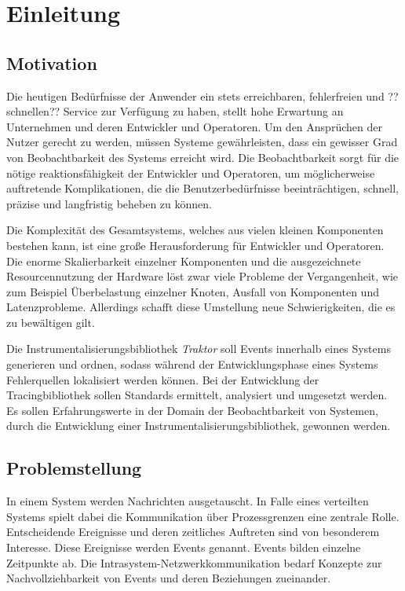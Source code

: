 %

\chapter{Einleitung}
\label{chapter:Einleitung}


\section{Motivation}
\label{section:Motivation}
	Die heutigen Bedürfnisse der Anwender ein stets erreichbaren, fehlerfreien und ??schnellen?? Service zur Verfügung zu haben, stellt hohe Erwartung an Unternehmen und deren Entwickler und Operatoren. Um den Ansprüchen der Nutzer gerecht zu werden, müssen Systeme gewährleisten, dass ein gewisser Grad von Beobachtbarkeit des Systems erreicht wird. Die Beobachtbarkeit sorgt für die nötige reaktionsfähigkeit der Entwickler und Operatoren, um möglicherweise auftretende Komplikationen, die die  Benutzerbedürfnisse beeinträchtigen, schnell, präzise und langfristig beheben zu können.
	
	Die Komplexität des Gesamtsystems, welches aus vielen kleinen Komponenten bestehen kann, ist eine große Herausforderung für Entwickler und Operatoren. Die enorme Skalierbarkeit einzelner Komponenten und die ausgezeichnete Resourcennutzung der Hardware löst zwar viele Probleme der Vergangenheit, wie zum Beispiel Überbelastung einzelner Knoten, Ausfall von Komponenten und Latenzprobleme. Allerdings schafft diese Umstellung neue Schwierigkeiten, die es zu bewältigen gilt. 
	
	Die Instrumentalisierungsbibliothek \emph{Traktor} soll Events innerhalb eines Systems generieren und ordnen, sodass während der Entwicklungsphase eines Systems Fehlerquellen lokalisiert werden können. Bei der Entwicklung der Tracingbibliothek sollen Standards ermittelt, analysiert und umgesetzt werden. Es sollen Erfahrungswerte in der Domain der Beobachtbarkeit von Systemen, durch die Entwicklung einer Instrumentalisierungsbibliothek, gewonnen werden.
	
\section{Problemstellung}
\label{section:Problemstellung}
	In einem System werden Nachrichten ausgetauscht. In Falle eines verteilten Systems spielt dabei die Kommunikation über Prozessgrenzen eine zentrale Rolle.
	Entscheidende Ereignisse und deren zeitliches Auftreten sind von besonderem Interesse. Diese Ereignisse werden Events genannt. Events bilden einzelne Zeitpunkte ab. Die Intrasystem-Netzwerkkommunikation bedarf Konzepte zur Nachvollziehbarkeit von Events und deren Beziehungen zueinander. 
	
